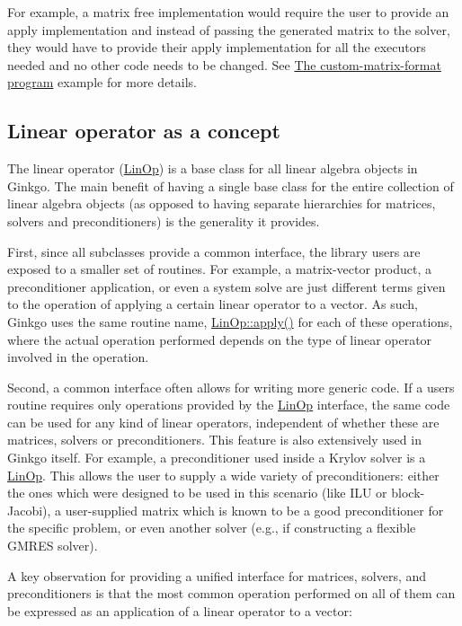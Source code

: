 For example, a matrix free implementation would require the user to provide an apply implementation and instead of passing the generated matrix to the solver, they would have to provide their apply implementation for all the executors needed and no other code needs to be changed. See \hyperlink{custom_matrix_format}{The custom-\/matrix-\/format program} example for more details.\hypertarget{group__LinOp_linop_concept}{}\subsection{Linear operator as a concept}\label{group__LinOp_linop_concept}
The linear operator (\hyperlink{classgko_1_1LinOp}{Lin\+Op}) is a base class for all linear algebra objects in Ginkgo. The main benefit of having a single base class for the entire collection of linear algebra objects (as opposed to having separate hierarchies for matrices, solvers and preconditioners) is the generality it provides.

First, since all subclasses provide a common interface, the library users are exposed to a smaller set of routines. For example, a matrix-\/vector product, a preconditioner application, or even a system solve are just different terms given to the operation of applying a certain linear operator to a vector. As such, Ginkgo uses the same routine name, \hyperlink{classgko_1_1LinOp_a0449b2fc705d2f970855af23b5e2788e}{Lin\+Op\+::apply()} for each of these operations, where the actual operation performed depends on the type of linear operator involved in the operation.

Second, a common interface often allows for writing more generic code. If a user\textquotesingle{}s routine requires only operations provided by the \hyperlink{classgko_1_1LinOp}{Lin\+Op} interface, the same code can be used for any kind of linear operators, independent of whether these are matrices, solvers or preconditioners. This feature is also extensively used in Ginkgo itself. For example, a preconditioner used inside a Krylov solver is a \hyperlink{classgko_1_1LinOp}{Lin\+Op}. This allows the user to supply a wide variety of preconditioners\+: either the ones which were designed to be used in this scenario (like I\+LU or block-\/\+Jacobi), a user-\/supplied matrix which is known to be a good preconditioner for the specific problem, or even another solver (e.\+g., if constructing a flexible G\+M\+R\+ES solver).

A key observation for providing a unified interface for matrices, solvers, and preconditioners is that the most common operation performed on all of them can be expressed as an application of a linear operator to a vector\+:


